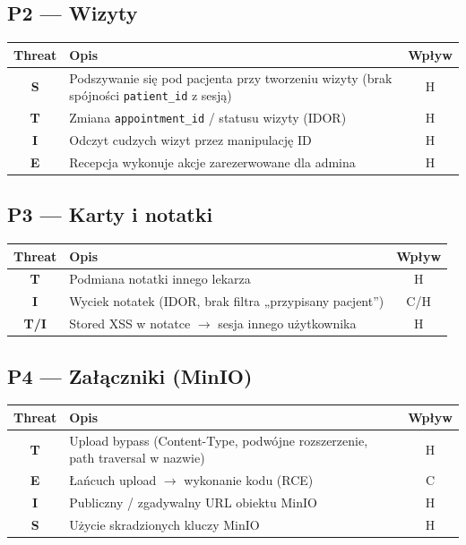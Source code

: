\documentclass[11pt,a4paper]{article}
\begin{document}
\vspace{0.3em}

\subsection{P2 — Wizyty}

\begin{tabularx}{\textwidth}{@{}>{\bfseries}c L c@{}}
\toprule
\normalfont\textbf{Threat} & \textbf{Opis} & \textbf{Wpływ} \\
\midrule
S & Podszywanie się pod pacjenta przy tworzeniu wizyty (brak spójności \texttt{patient\_id} z sesją) & H \\
T & Zmiana \texttt{appointment\_id} / statusu wizyty (IDOR) & H \\
I & Odczyt cudzych wizyt przez manipulację ID & H \\
E & Recepcja wykonuje akcje zarezerwowane dla admina & H \\
\bottomrule
\end{tabularx}

\subsection{P3 — Karty i notatki}

\begin{tabularx}{\textwidth}{@{}>{\bfseries}c L c@{}}
\toprule
\normalfont\textbf{Threat} & \textbf{Opis} & \textbf{Wpływ} \\
\midrule
T & Podmiana notatki innego lekarza & H \\
I & Wyciek notatek (IDOR, brak filtra „przypisany pacjent”) & C/H \\
T/I & Stored XSS w notatce $\rightarrow$ sesja innego użytkownika & H \\
\bottomrule
\end{tabularx}

\subsection{P4 — Załączniki (MinIO)}

\begin{tabularx}{\textwidth}{@{}>{\bfseries}c L c@{}}
\toprule
\normalfont\textbf{Threat} & \textbf{Opis} & \textbf{Wpływ} \\
\midrule
T & Upload bypass (Content-Type, podwójne rozszerzenie, path traversal w nazwie) & H \\
E & Łańcuch upload $\rightarrow$ wykonanie kodu (RCE) & C \\
I & Publiczny / zgadywalny URL obiektu MinIO & H \\
S & Użycie skradzionych kluczy MinIO & H \\
\bottomrule
\end{tabularx}
\end{document}
